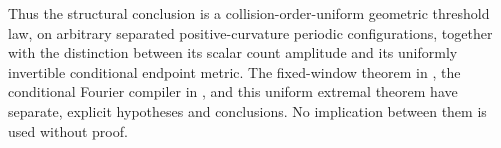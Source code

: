 Thus the structural conclusion is a collision-order-uniform geometric
threshold law, on arbitrary separated positive-curvature periodic configurations,
together with the distinction between its scalar count amplitude and
its uniformly invertible conditional endpoint metric. The
fixed-window theorem in \cite{TC}, the conditional Fourier compiler in
\cite{A2R33}, and this uniform extremal theorem have separate, explicit
hypotheses and conclusions. No implication between them is used without
proof.
